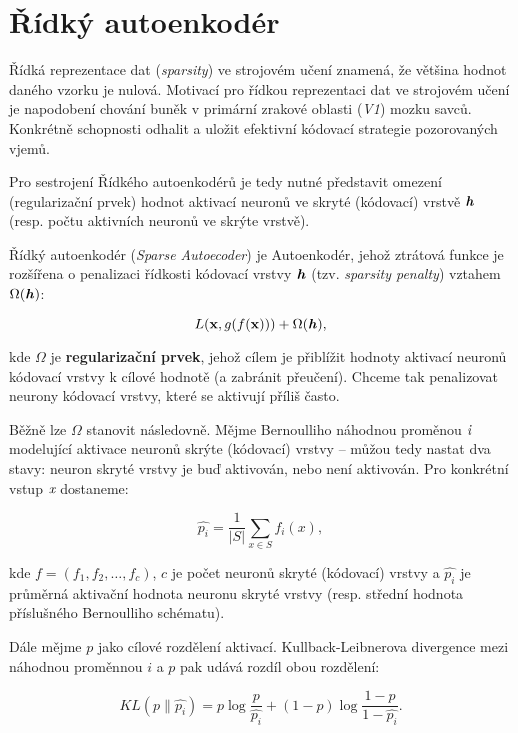 \section{Řídký autoenkodér}
\label{sec:sparse_autoencoder}
Řídká reprezentace dat (\emph{sparsity}) ve strojovém učení znamená, že většina hodnot daného vzorku je nulová. 
Motivací pro řídkou reprezentaci dat ve strojovém učení je napodobení chování buněk v primární zrakové oblasti (\emph{V1}) mozku savců.
Konkrétně schopnosti odhalit a uložit efektivní kódovací strategie pozorovaných vjemů. 

Pro sestrojení Řídkého autoenkodérů je tedy nutné představit omezení (regularizační prvek) hodnot aktivací neuronů ve skryté (kódovací) vrstvě $\textbf{\emph{h}}$ (resp. počtu aktivních neuronů ve skrýte vrstvě).

Řídký autoenkodér (\emph{Sparse Autoecoder}) je Autoenkodér, jehož ztrátová funkce je rozšířena o penalizaci řídkosti kódovací vrstvy $\textbf{\emph{h}}$ (tzv. \emph{sparsity penalty}) vztahem $\Omega(\textbf{\emph{h}})$:

\begin{equation}
    L(\mathbf{x}, g(f(\mathbf{x}))) + \Omega(\textbf{\emph{h}}),
\end{equation}

kde $\Omega$ je \textbf{regularizační prvek}, jehož cílem je přiblížit hodnoty aktivací neuronů kódovací vrstvy k cílové hodnotě (a zabránit přeučení).
Chceme tak penalizovat neurony kódovací vrstvy, které se aktivují příliš často.

Běžně lze $\Omega$ stanovit následovně. Mějme Bernoulliho náhodnou proměnou $\emph{i}$ modelující aktivace neuronů skrýte (kódovací) vrstvy – můžou tedy nastat dva stavy: neuron skryté vrstvy je buď aktivován, nebo není aktivován.
Pro konkrétní vstup $\emph{x}$ dostaneme:

\begin{equation}
    \hat{p_i} = \frac{1}{|S|}\sum_{x \in S}^{}f_i(x),
\end{equation}

kde $ f = (f_1, f_2, \dots, f_c)$, $c$ je počet neuronů skryté (kódovací) vrstvy a $\hat{p_i}$ je průměrná aktivační hodnota neuronu skryté vrstvy (resp. střední hodnota příslušného Bernoulliho schématu).

Dále mějme $p$ jako cílové rozdělení aktivací.
Kullback-Leibnerova divergence mezi náhodnou proměnnou $i$ a $p$ pak udává rozdíl obou rozdělení:

\begin{equation}
    KL(p \parallel \hat{p_i}) = p \log \frac{p}{\hat{p_i}} + (1 - p) \log \frac{1 - p}{1 - \hat{p_i}}.
\end{equation}

